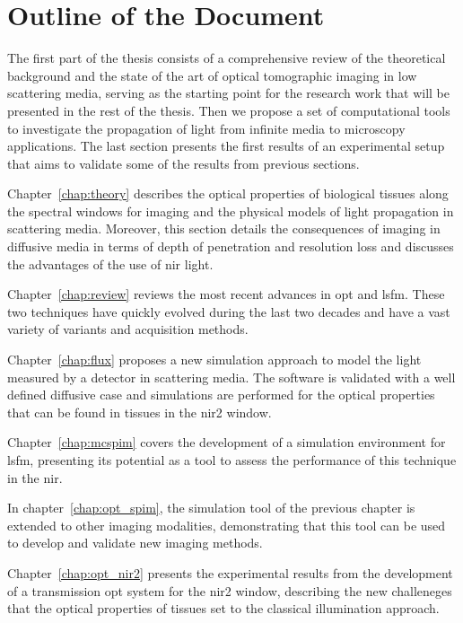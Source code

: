 \newpage
\section*{Outline of the Document}

The first part of the thesis consists of a comprehensive review of the theoretical background and the state of the art of optical tomographic imaging in low scattering media, serving as the starting point for the research work that will be presented in the rest of the thesis. Then we propose a set of computational tools to investigate the propagation of light from infinite media to microscopy applications. The last section presents the first results of an experimental setup that aims to validate some of the results from previous sections.

Chapter~\ref{chap:theory} describes the optical properties of biological tissues along the spectral windows for imaging and the physical models of light propagation in scattering media. Moreover, this section details the consequences of imaging in diffusive media in terms of depth of penetration and resolution loss and discusses the advantages of the use of \gls{nir} light.

Chapter~\ref{chap:review} reviews the most recent advances in \gls{opt} and \gls{lsfm}. These two techniques have quickly evolved during the last two decades and have a vast variety of variants and acquisition methods. 

Chapter~\ref{chap:flux} proposes a new simulation approach to model the light measured by a detector in scattering media. The software is validated with a well defined diffusive case and simulations are performed for the optical properties that can be found in tissues in the \gls{nir2} window.

Chapter~\ref{chap:mcspim} covers the development of a simulation environment for \gls{lsfm}, presenting its potential as a tool to assess the performance of this technique in the \gls{nir}.

In chapter~\ref{chap:opt_spim}, the simulation tool of the previous chapter is extended to other imaging modalities, demonstrating that this tool can be used to develop and validate new imaging methods.

Chapter~\ref{chap:opt_nir2} presents the experimental results from the development of a transmission \gls{opt} system for the \gls{nir2} window, describing the new challeneges that the optical properties of tissues set to the classical illumination approach.